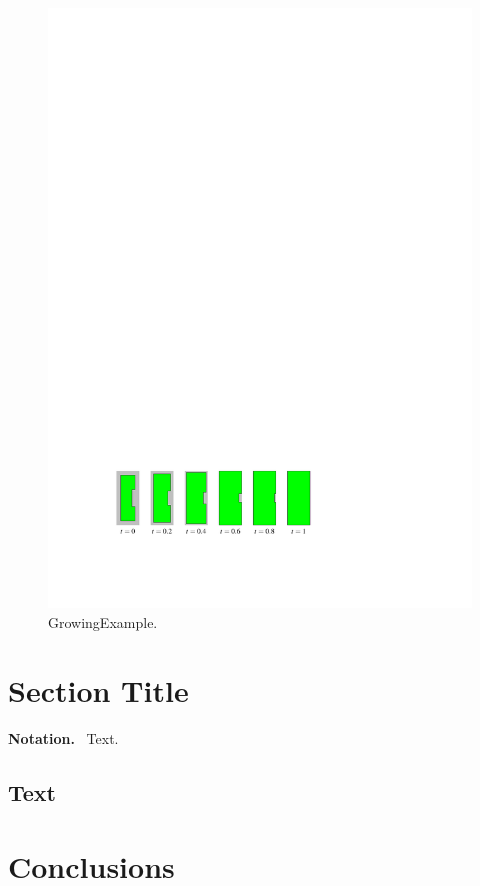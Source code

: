 \documentclass[graybox]{svmult}
\newcommand{\mypar}[1]{\bigskip\noindent\textbf{#1.}~}
\begin{document}
\begin{figure}[tb]
	\centering
	\includegraphics{GrowingExample}
	\caption{GrowingExample.}
	\label{fig:GrowingExample}
\end{figure}

\section{Section Title}
\label{sec:AStarAlgorithm}

\mypar{Notation}
Text. 

\subsection{Text}
\label{sec:Formalizing}



\section{Conclusions}
\label{sec:Conclusions}
\end{document}
